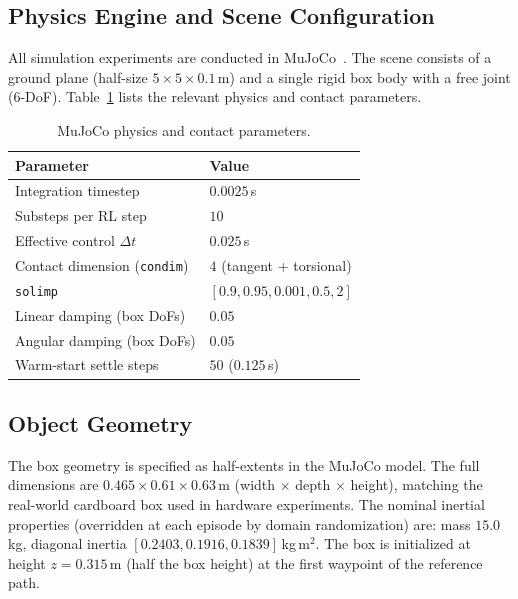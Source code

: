 \subsection{Physics Engine and Scene Configuration}

All simulation experiments are conducted in MuJoCo~\cite{todorov2012mujoco}.
The scene consists of a ground plane (half-size $5 \times 5 \times 0.1$\,m) and a single rigid box body with a free joint (6-DoF).
Table~\ref{tab:mujoco_physics} lists the relevant physics and contact parameters.

\begin{table}[h]
\centering
\caption{MuJoCo physics and contact parameters.}
\label{tab:mujoco_physics}
\begin{tabular}{ll}
\toprule
\textbf{Parameter}              & \textbf{Value}              \\
\midrule
Integration timestep            & $0.0025$\,s                 \\
Substeps per RL step            & $10$                        \\
Effective control $\Delta t$    & $0.025$\,s                  \\
Contact dimension (\texttt{condim}) & $4$ (tangent + torsional) \\
\texttt{solimp}                 & $[0.9, 0.95, 0.001, 0.5, 2]$ \\
Linear damping (box DoFs)       & $0.05$                      \\
Angular damping (box DoFs)      & $0.05$                      \\
Warm-start settle steps         & $50$ ($0.125$\,s)           \\
\bottomrule
\end{tabular}
\end{table}

\subsection{Object Geometry}

The box geometry is specified as half-extents in the MuJoCo model.
The full dimensions are $0.465 \times 0.61 \times 0.63$\,m (width $\times$ depth $\times$ height), matching the real-world cardboard box used in hardware experiments.
The nominal inertial properties (overridden at each episode by domain randomization) are: mass $15.0$\,kg, diagonal inertia $[0.2403, 0.1916, 0.1839]$\,kg\,m$^2$.
The box is initialized at height $z = 0.315$\,m (half the box height) at the first waypoint of the reference path.

